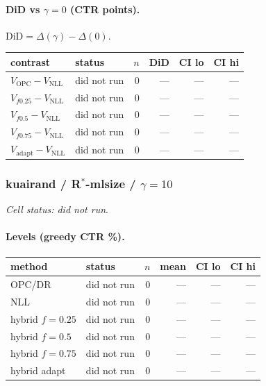 \documentclass[10pt,a4paper]{article}
\begin{document}
\paragraph{DiD vs $\gamma=0$ (CTR points).} $\mathrm{DiD}=\Delta(\gamma)-\Delta(0)$.
{\centering\small\begin{tabular}{llrrrr}
\toprule contrast & status & $n$ & DiD & CI lo & CI hi \\
\midrule
$V_{\mathrm{OPC}}-V_{\mathrm{NLL}}$ & did not run & 0 & --- & --- & --- \\
$V_{f0.25}-V_{\mathrm{NLL}}$ & did not run & 0 & --- & --- & --- \\
$V_{f0.5}-V_{\mathrm{NLL}}$ & did not run & 0 & --- & --- & --- \\
$V_{f0.75}-V_{\mathrm{NLL}}$ & did not run & 0 & --- & --- & --- \\
$V_{\mathrm{adapt}}-V_{\mathrm{NLL}}$ & did not run & 0 & --- & --- & --- \\
\bottomrule\end{tabular}\par}
\bigskip
\subsubsection{kuairand / R$^*$-mlsize / $\gamma=10$}
\emph{Cell status: did not run}.
\paragraph{Levels (greedy CTR \%).}
{\centering\small\begin{tabular}{llrrrr}
\toprule method & status & $n$ & mean & CI lo & CI hi \\
\midrule
OPC/DR & did not run & 0 & --- & --- & --- \\
NLL & did not run & 0 & --- & --- & --- \\
hybrid $f{=}0.25$ & did not run & 0 & --- & --- & --- \\
hybrid $f{=}0.5$ & did not run & 0 & --- & --- & --- \\
hybrid $f{=}0.75$ & did not run & 0 & --- & --- & --- \\
hybrid adapt & did not run & 0 & --- & --- & --- \\
\bottomrule\end{tabular}\par}
\end{document}
